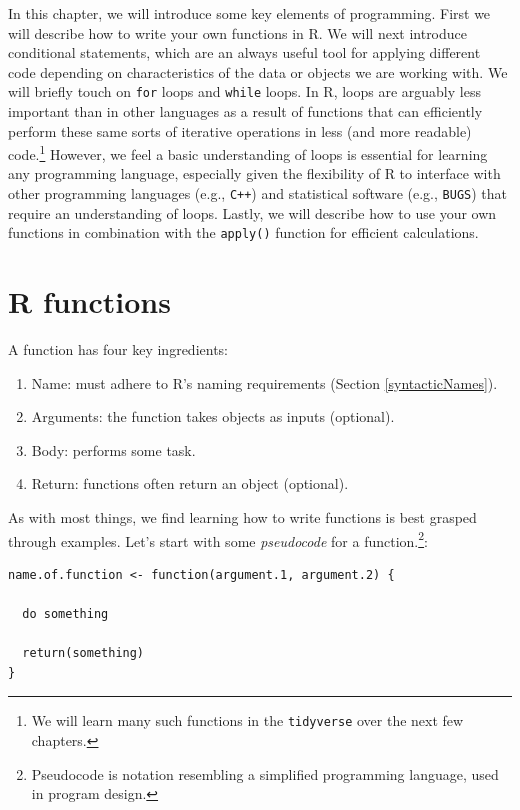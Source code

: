 \documentclass[
  11pt,
]{krantz}
\providecommand{\tightlist}{%
  \setlength{\itemsep}{0pt}\setlength{\parskip}{0pt}}
\theoremstyle{definition}
\theoremstyle{definition}
\theoremstyle{definition}
\theoremstyle{definition}
\theoremstyle{remark}
\begin{document}
In this chapter, we will introduce some key elements of programming. First we will describe how to write your own functions in R. We will next introduce conditional statements, which are an always useful tool for applying different code depending on characteristics of the data or objects we are working with. We will briefly touch on \texttt{for} loops and \texttt{while} loops. In R, loops are arguably less important than in other languages as a result of functions that can efficiently perform these same sorts of iterative operations in less (and more readable) code.\footnote{We will learn many such functions in the \texttt{tidyverse} over the next few chapters.} However, we feel a basic understanding of loops is essential for learning any programming language, especially given the flexibility of R to interface with other programming languages (e.g., \texttt{C++}) and statistical software (e.g., \texttt{BUGS}) that require an understanding of loops. Lastly, we will describe how to use your own functions in combination with the \texttt{apply()} function for efficient calculations.

\hypertarget{r-functions}{%
\section{R functions}\label{r-functions}}

A function has four key ingredients:

\begin{enumerate}
\def\labelenumi{\arabic{enumi}.}
\tightlist
\item
  Name: must adhere to R's naming requirements (Section \ref{syntacticNames}).
\item
  Arguments: the function takes objects as inputs (optional).
\item
  Body: performs some task.
\item
  Return: functions often return an object (optional).
\end{enumerate}

As with most things, we find learning how to write functions is best grasped through examples. Let's start with some \emph{pseudocode} for a function.\footnote{Pseudocode is notation resembling a simplified programming language, used in program design.}:

\begin{verbatim}
name.of.function <- function(argument.1, argument.2) {
  
  do something
    
  return(something)
}
\end{verbatim}
\end{document}
